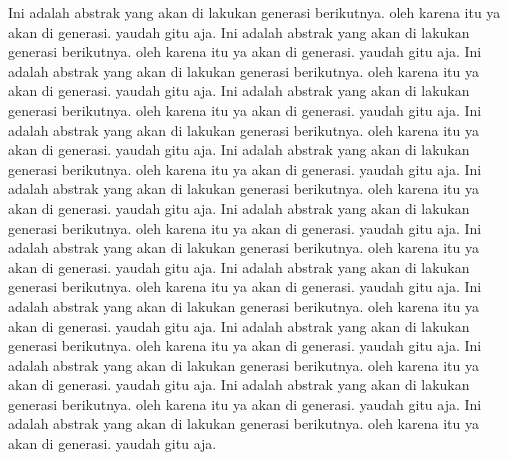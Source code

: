 
Ini adalah abstrak yang akan di lakukan generasi berikutnya. oleh karena itu ya akan di generasi. yaudah gitu aja. Ini adalah abstrak yang akan di lakukan generasi berikutnya. oleh karena itu ya akan di generasi. yaudah gitu aja. Ini adalah abstrak yang akan di lakukan generasi berikutnya. oleh karena itu ya akan di generasi. yaudah gitu aja. Ini adalah abstrak yang akan di lakukan generasi berikutnya. oleh karena itu ya akan di generasi. yaudah gitu aja. Ini adalah abstrak yang akan di lakukan generasi berikutnya. oleh karena itu ya akan di generasi. yaudah gitu aja. Ini adalah abstrak yang akan di lakukan generasi berikutnya. oleh karena itu ya akan di generasi. yaudah gitu aja. Ini adalah abstrak yang akan di lakukan generasi berikutnya. oleh karena itu ya akan di generasi. yaudah gitu aja. Ini adalah abstrak yang akan di lakukan generasi berikutnya. oleh karena itu ya akan di generasi. yaudah gitu aja. Ini adalah abstrak yang akan di lakukan generasi berikutnya. oleh karena itu ya akan di generasi. yaudah gitu aja. Ini adalah abstrak yang akan di lakukan generasi berikutnya. oleh karena itu ya akan di generasi. yaudah gitu aja. Ini adalah abstrak yang akan di lakukan generasi berikutnya. oleh karena itu ya akan di generasi. yaudah gitu aja. Ini adalah abstrak yang akan di lakukan generasi berikutnya. oleh karena itu ya akan di generasi. yaudah gitu aja. Ini adalah abstrak yang akan di lakukan generasi berikutnya. oleh karena itu ya akan di generasi. yaudah gitu aja. Ini adalah abstrak yang akan di lakukan generasi berikutnya. oleh karena itu ya akan di generasi. yaudah gitu aja. Ini adalah abstrak yang akan di lakukan generasi berikutnya. oleh karena itu ya akan di generasi. yaudah gitu aja.